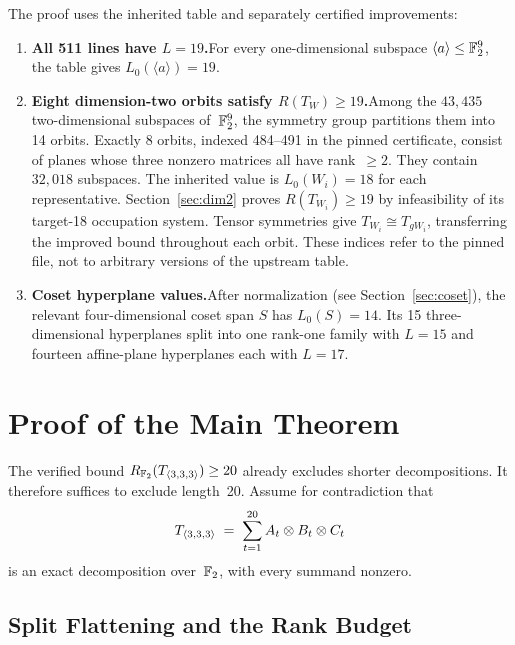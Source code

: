 \documentclass[11pt,a4paper]{article}
\begin{document}
The proof uses the inherited table and separately certified improvements:

\begin{enumerate}[label=(\roman*)]
  \item\label{it:lines} \textbf{All 511 lines have $L=19$.}\quad For every one-dimensional subspace $\langle a\rangle\le\mathbb{F}_2^9$, the table gives $L_0(\langle a\rangle)=19$.

  \item\label{it:dim2} \textbf{Eight dimension-two orbits satisfy $R(T_W)\ge19$.}\quad Among the $43{,}435$ two-dimensional subspaces of~$\mathbb{F}_2^9$, the symmetry group partitions them into 14 orbits. Exactly 8 orbits, indexed 484--491 in the pinned certificate, consist of planes whose three nonzero matrices all have rank~$\ge2$. They contain $32{,}018$ subspaces. The inherited value is $L_0(W_i)=18$ for each representative. Section~\ref{sec:dim2} proves $R(T_{W_i})\ge19$ by infeasibility of its target-18 occupation system. Tensor symmetries give $T_{W_i}\cong T_{gW_i}$, transferring the improved bound throughout each orbit. These indices refer to the pinned file, not to arbitrary versions of the upstream table.

  \item\label{it:coset} \textbf{Coset hyperplane values.}\quad After normalization (see Section~\ref{sec:coset}), the relevant four-dimensional coset span $S$ has $L_0(S)=14$.  Its 15 three-dimensional hyperplanes split into one rank-one family with $L=15$ and fourteen affine-plane hyperplanes each with $L=17$.
\end{enumerate}


\section{Proof of the Main Theorem}\label{sec:proof}

The verified bound $R_{\mathbb{F}_2}(T_{\langle3,3,3\rangle})\ge20$ already excludes shorter decompositions. It therefore suffices to exclude length~20. Assume for contradiction that
\begin{equation}\label{eq:decomp}
  T_{\langle3,3,3\rangle} \;=\; \sum_{t=1}^{20} A_t\otimes B_t\otimes C_t
\end{equation}
is an exact decomposition over~$\mathbb{F}_2$, with every summand nonzero.

\subsection{Split Flattening and the Rank Budget}\label{sec:flattening}
\end{document}

